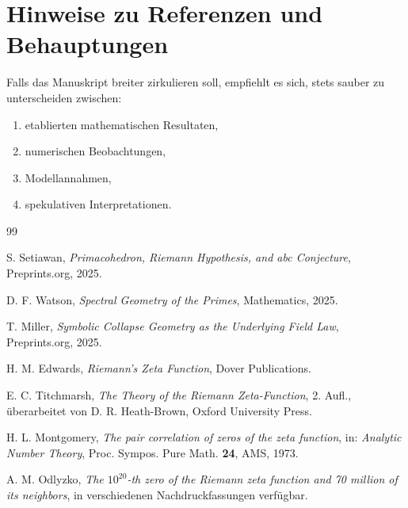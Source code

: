 \documentclass[11pt,a4paper]{amsart}
\theoremstyle{plain}
\theoremstyle{definition}
\theoremstyle{remark}
\begin{document}
	\section{Hinweise zu Referenzen und Behauptungen}
	
	Falls das Manuskript breiter zirkulieren soll, empfiehlt es sich, stets sauber zu unterscheiden zwischen:
	\begin{enumerate}[label=\arabic*.]
		\item etablierten mathematischen Resultaten,
		\item numerischen Beobachtungen,
		\item Modellannahmen,
		\item spekulativen Interpretationen.
	\end{enumerate}
	
	\begin{thebibliography}{99}
		
		S. Setiawan,
		\textit{Primacohedron, Riemann Hypothesis, and abc Conjecture},
		Preprints.org, 2025.
		
		D. F. Watson,
		\textit{Spectral Geometry of the Primes},
		Mathematics, 2025.
		
		T. Miller,
		\textit{Symbolic Collapse Geometry as the Underlying Field Law},
		Preprints.org, 2025.
		
		H. M. Edwards,
		\textit{Riemann's Zeta Function},
		Dover Publications.
		
		E. C. Titchmarsh,
		\textit{The Theory of the Riemann Zeta-Function},
		2. Aufl., überarbeitet von D. R. Heath-Brown,
		Oxford University Press.
		
		H. L. Montgomery,
		\textit{The pair correlation of zeros of the zeta function},
		in: \textit{Analytic Number Theory}, Proc. Sympos. Pure Math. \textbf{24}, AMS, 1973.
		
		A. M. Odlyzko,
		\textit{The \(10^{20}\)-th zero of the Riemann zeta function and 70 million of its neighbors},
		in verschiedenen Nachdruckfassungen verfügbar.
		
	\end{thebibliography}
	
\end{document}
